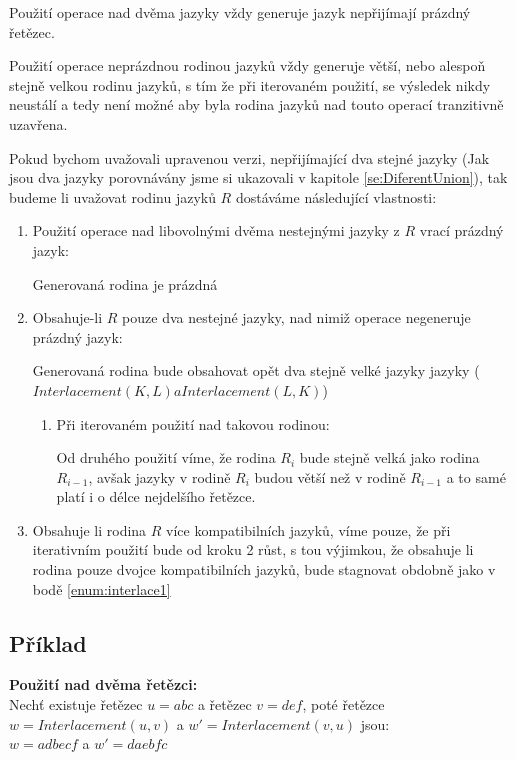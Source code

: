 Použití operace nad dvěma jazyky vždy generuje jazyk nepřijímají prázdný řetězec.

Použití operace neprázdnou rodinou jazyků vždy generuje větší, nebo alespoň stejně velkou rodinu jazyků, s tím že při iterovaném použití, se výsledek nikdy neustálí a tedy není možné aby byla rodina jazyků nad touto operací tranzitivně uzavřena. 
  
  
Pokud bychom uvažovali upravenou verzi, nepřijímající dva stejné jazyky (Jak jsou dva jazyky porovnávány jsme si ukazovali v kapitole \ref{se:DiferentUnion}), tak budeme li uvažovat rodinu jazyků $R$ dostáváme následující vlastnosti:
\begin{enumerate}
	\item Použití operace nad libovolnými dvěma nestejnými jazyky z $R$ vrací prázdný jazyk:
	
	Generovaná rodina je prázdná
	
	\item \label{enum:interlace1} Obsahuje-li $R$ pouze dva nestejné jazyky, nad nimiž operace negeneruje prázdný jazyk:
	
	Generovaná rodina bude obsahovat opět dva stejně velké jazyky jazyky ($Interlacement(K,L) a Interlacement(L,K)$)
	
	\begin{enumerate}
		\item Při iterovaném použití nad takovou rodinou:
		
		Od druhého použití víme, že rodina $R_{i}$ bude stejně velká jako rodina $R_{i-1}$, avšak jazyky v rodině $R_{i}$ budou větší než v rodině $R_{i-1}$ a to samé platí i o délce nejdelšího řetězce. 
	\end{enumerate}

	\item Obsahuje li rodina $R$ více kompatibilních jazyků, víme pouze, že při iterativním použití bude od kroku 2 růst, s tou výjimkou, že obsahuje li rodina pouze dvojce kompatibilních jazyků, bude stagnovat obdobně jako v bodě \ref{enum:interlace1}
\end{enumerate}
  
\subsection{Příklad}
\textbf{Použití nad dvěma řetězci:}\\
Nechť existuje řetězec $u=abc$ a řetězec $v=def$, poté řetězce $w=Interlacement(u,v)$ a $w'=Interlacement(v,u)$ jsou:\\
$w=adbecf$ a $w'=daebfc$

